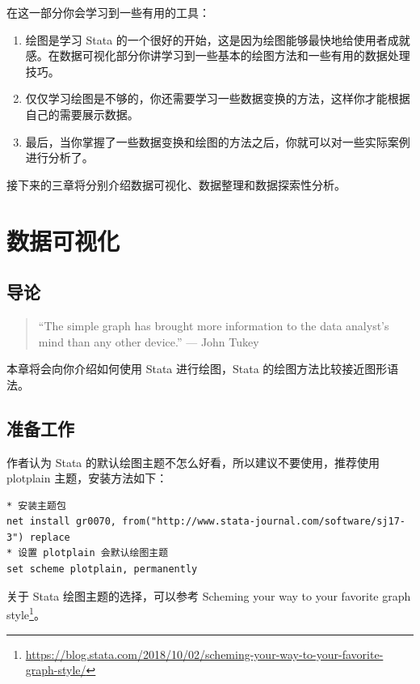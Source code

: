 \documentclass[]{ctexbook}
\providecommand{\tightlist}{%
  \setlength{\itemsep}{0pt}\setlength{\parskip}{0pt}}
\renewcommand{\href}[2]{#2\footnote{\url{#1}}}
\begin{document}
在这一部分你会学习到一些有用的工具：

\begin{enumerate}
\def\labelenumi{\arabic{enumi}.}
\tightlist
\item
  绘图是学习 Stata 的一个很好的开始，这是因为绘图能够最快地给使用者成就感。在数据可视化部分你讲学习到一些基本的绘图方法和一些有用的数据处理技巧。
\item
  仅仅学习绘图是不够的，你还需要学习一些数据变换的方法，这样你才能根据自己的需要展示数据。
\item
  最后，当你掌握了一些数据变换和绘图的方法之后，你就可以对一些实际案例进行分析了。
\end{enumerate}

接下来的三章将分别介绍数据可视化、数据整理和数据探索性分析。

\hypertarget{section-25}{%
\chapter{数据可视化}\label{section-25}}

\hypertarget{section-26}{%
\section{导论}\label{section-26}}

\begin{quote}
``The simple graph has brought more information to the data analyst's mind than any other device.'' --- John Tukey
\end{quote}

本章将会向你介绍如何使用 Stata 进行绘图，Stata 的绘图方法比较接近图形语法。

\hypertarget{section-27}{%
\section{准备工作}\label{section-27}}

作者认为 Stata 的默认绘图主题不怎么好看，所以建议不要使用，推荐使用 plotplain 主题，安装方法如下：

\begin{lstlisting}
* 安装主题包
net install gr0070, from("http://www.stata-journal.com/software/sj17-3") replace
* 设置 plotplain 会默认绘图主题
set scheme plotplain, permanently
\end{lstlisting}

关于 Stata 绘图主题的选择，可以参考 \href{https://blog.stata.com/2018/10/02/scheming-your-way-to-your-favorite-graph-style/}{Scheming your way to your favorite graph style}。
\end{document}
